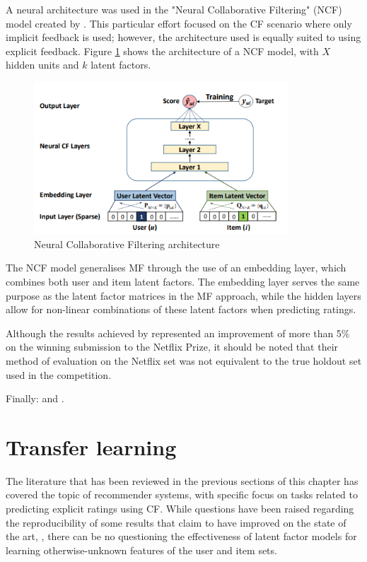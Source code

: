 A neural architecture was used in the "Neural Collaborative Filtering" (NCF) model created by \cite{he2017neural}. This particular effort focused on the CF scenario where only implicit feedback is used; however, the architecture used is equally suited to using explicit feedback. Figure \ref{fig:ncf-arch} shows the architecture of a NCF model, with $X$ hidden units and $k$ latent factors.

\begin{figure}[H]
\centering
\includegraphics[width=9.5cm]{Figures/2_neural-cf.png}
\decoRule
\caption[Neural Collaborative Filtering]{Neural Collaborative Filtering architecture \parencite{he2017neural}}
\label{fig:ncf-arch}
\end{figure}

The NCF model generalises MF through the use of an embedding layer, which combines both user and item latent factors. The embedding layer serves the same purpose as the latent factor matrices in the MF approach, while the hidden layers allow for non-linear combinations of these latent factors when predicting ratings.

Although the results achieved by \citeauthor{sedhain2015autorec} represented an improvement of more than 5\% on the winning submission to the Netflix Prize, it should be noted that their method of evaluation on the Netflix set was not equivalent to the true holdout set used in the competition.

Finally: \parencite{rendle2019difficulty} and \parencite{dacrema2019we}.

\section{Transfer learning}
The literature that has been reviewed in the previous sections of this chapter has covered the topic of recommender systems, with specific focus on tasks related to predicting explicit ratings using CF. While questions have been raised regarding the reproducibility of some results that claim to have improved on the state of the art, \parencite{dacrema2019we}, there can be no questioning the effectiveness of latent factor models for learning otherwise-unknown features of the user and item sets.

